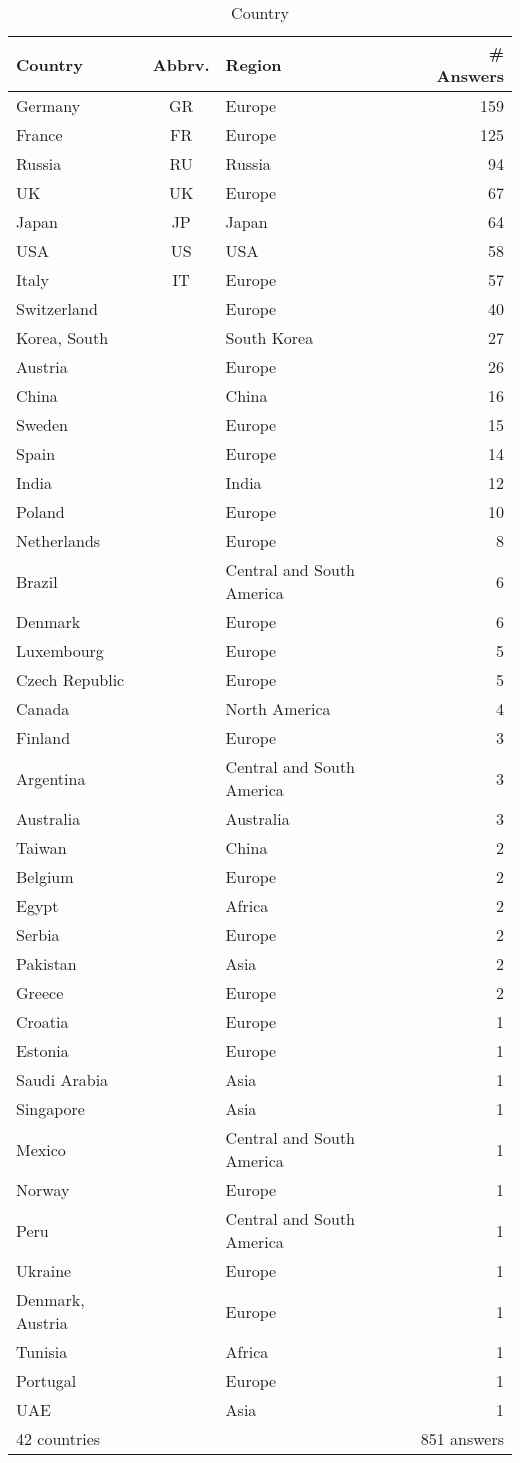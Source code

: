 \begin{table}[htb]%
\begin{center}%
\caption{Country}\label{tab:countries}%
\begin{tabular}{l|c|l|r}%
\hline%
Country & Abbrv. & Region & \# Answers \\%
\hline%
Germany&GR&Europe&159\\%
France&FR&Europe&125\\%
Russia&RU&Russia&94\\%
UK&UK&Europe&67\\%
Japan&JP&Japan&64\\%
USA&US&USA&58\\%
Italy&IT&Europe&57\\%
\hline%
Switzerland&&Europe&40\\%
Korea, South&&South Korea&27\\%
Austria&&Europe&26\\%
China&&China&16\\%
Sweden&&Europe&15\\%
Spain&&Europe&14\\%
India&&India&12\\%
Poland&&Europe&10\\%
Netherlands&&Europe&8\\%
Brazil&&Central and South America&6\\%
Denmark&&Europe&6\\%
Luxembourg&&Europe&5\\%
Czech Republic&&Europe&5\\%
Canada&&North America&4\\%
Finland&&Europe&3\\%
Argentina&&Central and South America&3\\%
Australia&&Australia&3\\%
Taiwan&&China&2\\%
Belgium&&Europe&2\\%
Egypt&&Africa&2\\%
Serbia&&Europe&2\\%
Pakistan&&Asia&2\\%
Greece&&Europe&2\\%
Croatia&&Europe&1\\%
Estonia&&Europe&1\\%
Saudi Arabia&&Asia&1\\%
Singapore&&Asia&1\\%
Mexico&&Central and South America&1\\%
Norway&&Europe&1\\%
Peru&&Central and South America&1\\%
Ukraine&&Europe&1\\%
Denmark, Austria&&Europe&1\\%
Tunisia&&Africa&1\\%
Portugal&&Europe&1\\%
UAE&&Asia&1\\%
\hline%
42 countries & & & 851 answers \\%
\hline%
\end{tabular}%
\end{center}%
\end{table}%
